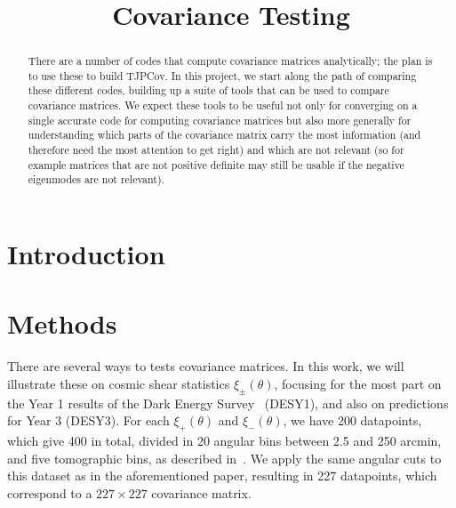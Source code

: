 \documentclass[twocolumn]{\docclass}
\begin{document}
\title{Covariance Testing}

\maketitlepre

\begin{abstract}

There are a number of codes that compute covariance matrices analytically; the plan is to use these to build TJPCov. In this project, we start along the path of comparing these different codes, building up a suite of tools that can be used to compare covariance matrices. We expect these tools to be useful not only for converging on a single accurate code for computing covariance matrices but also more generally for understanding which parts of the covariance matrix carry the most information (and therefore need the most attention to get right) and which are not relevant (so for example matrices that are not positive definite may still be usable if the negative eigenmodes are not relevant).
\end{abstract}

\dockeys{}

\maketitlepost


\section{Introduction}
\label{sec:intro}



\section{Methods}
\label{sec:methods}

There are several ways to tests covariance matrices. In this work, we will illustrate these on cosmic shear statistics $\xi_\pm(\theta)$, focusing for the most part on the Year 1 results of the Dark Energy Survey~\citep{Abbott:2017wau} (DESY1), and also on predictions for Year 3 (DESY3).  For each $\xi_+(\theta)$ and $\xi_-(\theta)$, we have 200 datapoints, which give 400 in total, divided in 20 angular bins between 2.5 and 250 arcmin, and five tomographic bins, as described in~\citep{Abbott:2018cms}. We apply the same angular cuts to this dataset as in the aforementioned paper, resulting in 227 datapoints, which correspond to a $227 \times 227$ covariance matrix.
\end{document}
